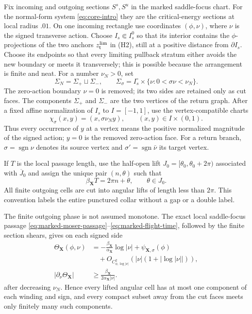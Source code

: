 \documentclass[11pt]{amsart}
\numberwithin{equation}{section}
\theoremstyle{definition}
\theoremstyle{remark}
\begin{document}
Fix incoming and outgoing sections $S^s,S^u$ in the marked saddle-focus
chart.  For the normal-form system \eqref{eq:core-intro} they are the
critical-energy sections at
local radius $.01$.  On one incoming rectangle use coordinates
$(\phi,\nu)$, where $\nu$ is the signed transverse action.  Choose
$I_s\Subset I_s^0$ so that its interior contains the $\phi$-projections of
the two anchors $z^{\rm lim}_{\mathsf t}$ in \textup{(H2)}, still at a
positive distance from $\partial I_s$.  Choose its endpoints so that every
limiting pullback stratum either avoids the new boundary or meets it
transversely; this is possible because the arrangement is finite and neat.
For a number $\nu_N>0$, set
\begin{equation}\label{eq:QN}
 \Sigma_N=\Sigma_+\sqcup\Sigma_-,\qquad
 \Sigma_\sigma=I_s^\circ\times\{\nu:0<\sigma\nu<\nu_N\}.
\end{equation}
The zero-action boundary $\nu=0$ is removed; its two sides are retained
only as cut faces.
The components $\Sigma_+$ and $\Sigma_-$ are the two vertices of the return graph.
After a fixed affine normalization of $I_s$ to $I=[-1,1]$, use the
vertex-compatible charts
\begin{equation}\label{eq:signed-vertex-charts}
 \chi_\sigma(x,y)=(x,\sigma\nu_Ny),
 \qquad (x,y)\in I\times(0,1).
\end{equation}
Thus every occurrence of $y$ at a vertex means the positive normalized
magnitude of the signed action; $y=0$ is the removed zero-action face.
For a return branch, $\sigma=\operatorname{sgn}\nu$ denotes its source
vertex and $\sigma'=\operatorname{sgn}\bar\nu$ its target vertex.

If $T$ is the local passage length, use the half-open lift
$J_0=[\theta_0,\theta_0+2\pi)$ associated with $\overline J_0$ and assign
the unique pair $(n,\theta)$
such that
\begin{equation}\label{eq:winding-label}
 \beta_{\mathbf X}T=2\pi n+\theta,\qquad \theta\in J_0.
\end{equation}
All finite outgoing cells are cut into angular lifts of length less than
$2\pi$.  This convention labels the entire punctured collar without a gap
or a double label.

The finite outgoing phase is not assumed monotone.  The exact local
saddle-focus passage
\eqref{eq:marked-moser-passage}--\eqref{eq:marked-flight-time}, followed by
the finite section shears, gives on each signed side
\begin{equation}\label{eq:local-phase-monotonicity}
 \begin{aligned}
 \Theta_{\mathbf X}(\phi,\nu)
 &=-\frac{\beta_{\mathbf X}}{\alpha_{\mathbf X}}
       \log|\nu|+\psi_{\mathbf X,\sigma}(\phi)\\
 &\quad+O_{C^2_{\phi,\log|\nu|}}
       (|\nu|(1+|\log|\nu||)),\\
 |\partial_\nu\Theta_{\mathbf X}|
 &\ge\frac{\beta_{\mathbf X}}{2\alpha_{\mathbf X}|\nu|}.
 \end{aligned}
\end{equation}
after decreasing $\nu_N$.  Hence every lifted angular cell has at most one
component of each winding and sign, and every compact subset away from the
cut faces meets only finitely many such components.
\end{document}
